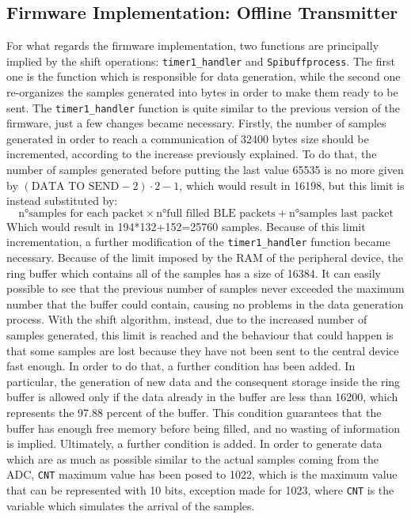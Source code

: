 \documentclass{Configuration_Files/PoliMi3i_thesis}
\begin{document}
\subsection{Firmware Implementation: Offline Transmitter}

For what regards the firmware implementation, two functions are principally implied by the shift operations: \texttt{timer1\_handler} and \texttt{Spibuffprocess}. The first one is the function which is responsible for data generation, while the second one re-organizes the samples generated into bytes in order to make them ready to be sent.
The \texttt{timer1\_handler} function is quite similar to the previous version of the firmware, just a few changes became necessary. Firstly, the number of samples generated in order to reach a communication of 32400 bytes size should be incremented, according to the increase previously explained. To do that, the number of samples generated before putting the last value 65535 is no more given by $(\text{DATA TO SEND}-2) \cdot 2-1$, which would result in 16198, but this limit is instead substituted by:
\[
\text{n°samples for each packet} \times \text{n°full filled BLE packets} + \text{n°samples last packet}
\]
Which would result in 194*132+152=25760 samples. 
Because of this limit incrementation, a further modification of the \texttt{timer1\_handler} function became necessary. Because of the limit imposed by the RAM of the peripheral device, the ring buffer which contains all of the samples has a size of 16384. It can easily possible to see that the previous number of samples never exceeded the maximum number that the buffer could contain, causing no problems in the data generation process. 
With the shift algorithm, instead, due to the increased number of samples generated, this limit is reached and the behaviour that could happen is that some samples are lost because they have not been sent to the central device fast enough. In order to do that, a further condition has been added. In particular, the generation of new data and the consequent storage inside the ring buffer is allowed only if the data already in the buffer are less than 16200, which represents the 97.88 percent of the buffer. This condition guarantees that the buffer has enough free memory before being filled, and no wasting of information is implied. Ultimately, a further condition is added. In order to generate data which are as much as possible similar to the actual samples coming from the ADC, \texttt{CNT} maximum value has been posed to 1022, which is the maximum value that can be represented with 10 bits, exception made for 1023, where \texttt{CNT} is the variable which simulates the arrival of the samples.
\end{document}
